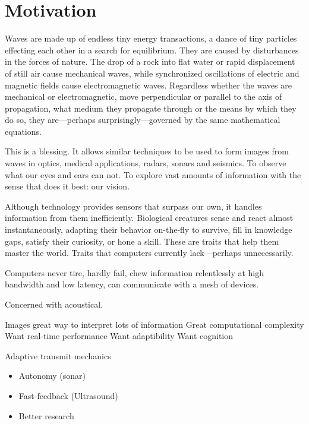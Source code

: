{\section{Motivation}

Waves are made up of endless tiny energy transactions, a dance of tiny particles effecting each other in a search for equilibrium. They are caused by disturbances in the forces of nature. The drop of a rock into flat water or rapid displacement of still air cause mechanical waves, while synchronized oscillations of electric and magnetic fields cause electromagnetic waves. Regardless whether the waves are mechanical or electromagnetic, move perpendicular or parallel to the axis of propagation, what medium they propagate through or the means by which they do so, they are---perhaps surprisingly---governed by the same mathematical equations.

This is a blessing. It allows similar techniques to be used to form images from waves in optics, medical applications, radars, sonars and seismics. To observe what our eyes and ears can not. To explore vast amounts of information with the sense that does it best: our vision.

Although technology provides sensors that surpass our own, it handles information from them inefficiently. Biological creatures sense and react almost instantaneously, adapting their behavior on-the-fly to survive, fill in knowledge gaps, satisfy their curiosity, or hone a skill. These are traits that help them master the world. Traits that computers currently lack---perhaps unnecessarily.

Computers never tire, hardly fail, chew information relentlessly at high bandwidth and low latency, can communicate with a mesh of devices. 





 Concerned with acoustical. 

Images great way to interpret lots of information
Great computational complexity
Want real-time performance
Want adaptibility
Want cognition


Adaptive
  transmit
  mechanics


\begin{itemize}
\item Autonomy (sonar)
\item Fast-feedback (Ultrasound)
\item Better research
\end{itemize}

}
